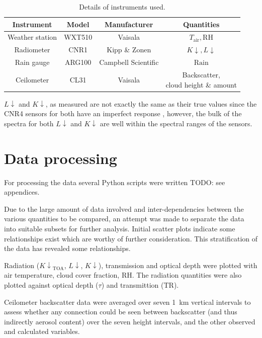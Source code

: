 \documentclass[a4paper,titlepage, twoside]{report}
\newcommand\Kdown{K\!\!\downarrow}
\newcommand\Ldown{L\!\!\downarrow}
\newcommand\Kdowntoa{{K\!\!\downarrow}_\mathrm{TOA}}
\begin{document}
\begin{table}
\begin{tabular}{ c c c c }
\toprule
Instrument &	Model &	Manufacturer &	Quantities \\ \midrule
Weather station &	WXT510 &	Vaisala &	$T_\mathrm{air}, \mathrm{RH}$ \\
Radiometer &	CNR1 &	Kipp \& Zonen & $\Kdown, \Ldown$ \\
Rain gauge &	ARG100	& Campbell Scientific &	$\mathrm{Rain}$ \\
Ceilometer &	CL31	& Vaisala	&	\shortstack{Backscatter,\\cloud height \& amount} \\ \bottomrule
\end{tabular}
\caption{Details of instruments used.}
\label{tab:dataset}
\end{table}

$\Ldown$ and $\Kdown$, as measured are not exactly the same as their true values since the CNR4 sensors for both have an imperfect response \parencite{kipp2}, however, the bulk of the spectra for both $\Ldown$ and $\Kdown$ are well within the spectral ranges of the sensors.

\section{Data processing}
For processing the data several Python scripts were written TODO: see appendices.

Due to the large amount of data involved and inter-dependencies between the various quantities to be compared, an attempt was made to separate the data into suitable subsets for further analysis. Initial scatter plots indicate some relationships exist which are worthy of further consideration.  This stratification of the data has revealed some relationships.

Radiation ($\Kdowntoa$, $\Ldown$, $\Kdown$), transmission and optical depth were plotted with air temperature, cloud cover fraction, RH. The radiation quantities were also plotted against optical depth ($\tau$) and transmittion ($\mathrm{TR}$).

Ceilometer backscatter data were averaged over seven \SI{1}{\kilo\meter} vertical intervals to assess whether any connection could be seen between backscatter (and thus indirectly aerosol content) over the seven height intervals, and the other observed and calculated variables.
\end{document}
